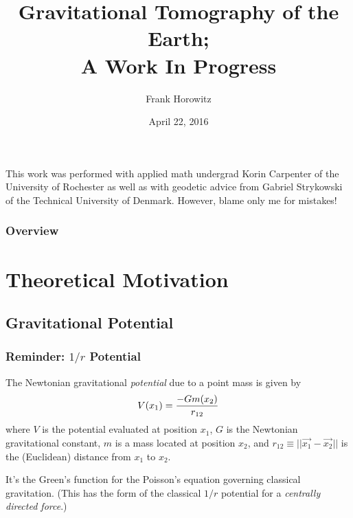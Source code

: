\documentclass[aspectratio=43,mathserif]{beamer}
\title[Gravitational Tomography]{Gravitational Tomography of the Earth; \\A Work In Progress } %
\author{Frank Horowitz} %
\institute[Cornell] %
{
Cornell University\\ %
\medskip
\textit{frank.horowitz@cornell.edu} %
}
\date{April 22, 2016} %
\begin{document}
\begin{frame}
\titlepage %

{\footnotesize This work was performed with applied math undergrad Korin Carpenter of the University of Rochester as well as with geodetic advice from Gabriel Strykowski of the Technical University of Denmark. However, blame only me for mistakes!}
\end{frame}

\begin{frame}
\frametitle{Overview} %
\tableofcontents %
\end{frame}


\section{Theoretical Motivation} %

\subsection{Gravitational Potential}
\begin{frame}
\frametitle{Reminder: $1/r$ Potential}

The Newtonian gravitational \emph{potential} due to a point mass is given by
$$V(x_1) = \frac{-G \/m(x_2)}{r_{12}}$$
where $V$ is the potential evaluated at position $x_1$, $G$ is the Newtonian gravitational constant, $m$ is a mass located at position $x_2$, and $r_{12} \equiv  ||\vec{x_1} - \vec{x_2}||$ is the (Euclidean) distance from $x_1$ to $x_2$.

It's the Green's function for the Poisson's equation governing classical gravitation. (This has the form of the classical $1/r$ potential for a \emph{centrally directed force}.)

\end{frame}
\end{document}
